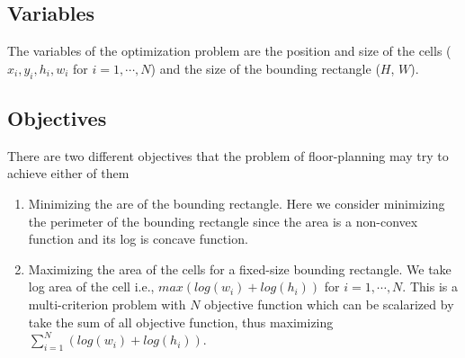 \documentclass[12pt] {article}
\begin{document}
\subsection*{Variables}
The variables of the optimization problem are the position and size of the cells ($x_{i}, y_{i}, h_{i}, w_{i}$ for $i=1,\cdots, N$) and the size of the bounding rectangle ($H$, $W$). 
\subsection*{Objectives} 
There are two different objectives that the problem of floor-planning may try to achieve either of them 
\begin{enumerate}
\item Minimizing the are of the bounding rectangle. Here we consider minimizing the perimeter of the bounding rectangle since the area is a non-convex function and its log is concave function.
\item Maximizing the area of the cells for a fixed-size bounding rectangle. We take log area of the cell i.e., $max (log(w_{i})+log(h_{i}))$ for $i=1,\cdots, N$. This is a multi-criterion problem with $N$ objective function which can be scalarized by take the sum of all objective function, thus maximizing $\sum_{i=1}^{N}(log(w_{i})+log(h_{i}))$.
\end{enumerate}
\end{document}

